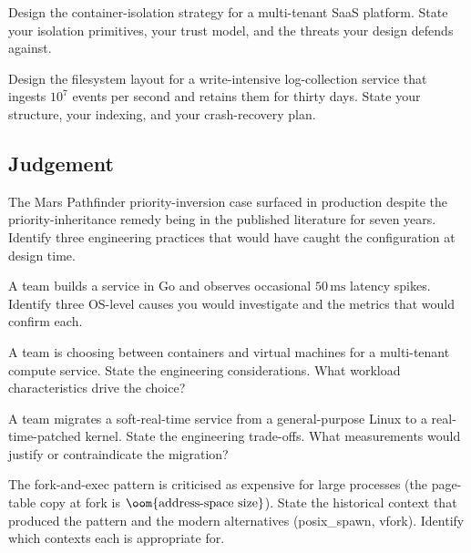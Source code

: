 \begin{exercise}
Design the container-isolation strategy for a multi-tenant SaaS platform. State your isolation primitives, your trust model, and the threats your design defends against.
\end{exercise}

\begin{exercise}
Design the filesystem layout for a write-intensive log-collection service that ingests $10^7$ events per second and retains them for thirty days. State your structure, your indexing, and your crash-recovery plan.
\end{exercise}

\subsection*{Judgement}

\begin{exercise}
The Mars Pathfinder priority-inversion case \cite{paper:jones-pathfinder-1997} surfaced in production despite the priority-inheritance remedy being in the published literature for seven years. Identify three engineering practices that would have caught the configuration at design time.
\end{exercise}

\begin{exercise}
A team builds a service in Go and observes occasional $50\,\si{\milli\second}$ latency spikes. Identify three OS-level causes you would investigate and the metrics that would confirm each.
\end{exercise}

\begin{exercise}
A team is choosing between containers and virtual machines for a multi-tenant compute service. State the engineering considerations. What workload characteristics drive the choice?
\end{exercise}

\begin{exercise}
A team migrates a soft-real-time service from a general-purpose Linux to a real-time-patched kernel. State the engineering trade-offs. What measurements would justify or contraindicate the migration?
\end{exercise}

\begin{exercise}
The fork-and-exec pattern is criticised as expensive for large processes (the page-table copy at fork is $\oom{\text{address-space size}}$). State the historical context that produced the pattern and the modern alternatives (posix\_spawn, vfork). Identify which contexts each is appropriate for.
\end{exercise}

